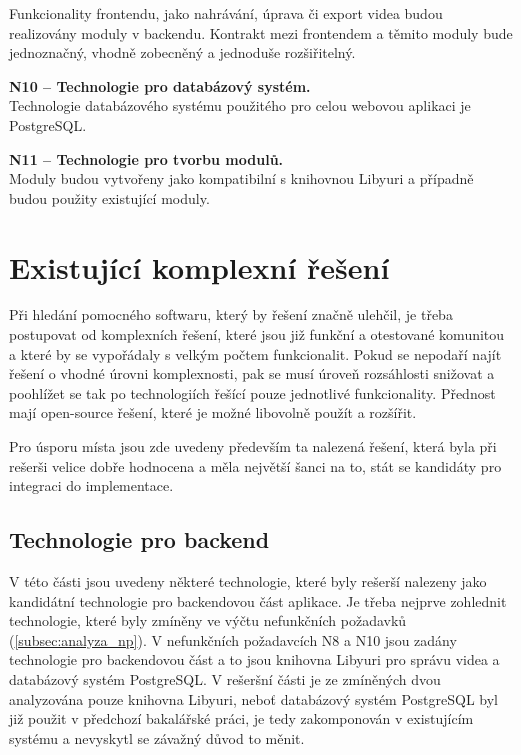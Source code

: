 \documentclass[thesis=M,czech]{FITthesis}[2012/06/26]
\begin{document}
\begin{description}
	Funkcionality frontendu, jako nahrávání, úprava či export videa budou realizovány moduly v backendu. Kontrakt mezi frontendem a těmito moduly bude jednoznačný, vhodně zobecněný a jednoduše rozšiřitelný.
    \item \textbf{N10 -- Technologie pro databázový systém.\\}
	Technologie databázového systému použitého pro celou webovou aplikaci je PostgreSQL.
    \item \textbf{N11 -- Technologie pro tvorbu modulů.\\}
	Moduly budou vytvořeny jako kompatibilní s knihovnou Libyuri a případně budou použity existující moduly.
  \end{description}

\section{Existující komplexní řešení} \label{sec:analyza_existujici_reseni}
Při hledání pomocného softwaru, který by řešení značně ulehčil, je třeba postupovat od komplexních řešení, které jsou již funkční a otestované komunitou a které by se vypořádaly s velkým počtem funkcionalit. Pokud se nepodaří najít řešení o vhodné úrovni komplexnosti, pak se musí úroveň rozsáhlosti snižovat a poohlížet se tak po technologiích řešící pouze jednotlivé funkcionality. Přednost mají open-source řešení, které je možné libovolně použít a rozšířit.

	Pro úsporu místa jsou zde uvedeny především ta nalezená řešení, která byla při rešerši velice dobře hodnocena a měla největší šanci na to, stát se kandidáty pro integraci do implementace.

\subsection{Technologie pro backend} \label{subsec:analyza_reseni_backend}
V této části jsou uvedeny některé technologie, které byly rešerší nalezeny jako kandidátní technologie pro backendovou část aplikace. Je třeba nejprve zohlednit technologie, které byly zmíněny ve výčtu nefunkčních požadavků (\ref{subsec:analyza_np}). V nefunkčních požadavcích N8 a N10 jsou zadány technologie pro backendovou část a to jsou knihovna Libyuri pro správu videa a databázový systém PostgreSQL. V rešeršní části je ze zmíněných dvou analyzována pouze knihovna Libyuri, neboť databázový systém PostgreSQL byl již použit v předchozí bakalářské práci, je tedy zakomponován v existujícím systému a nevyskytl se závažný důvod to měnit.
\end{document}

